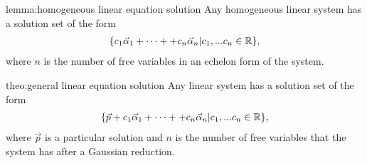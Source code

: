\begin{lemma}{lemma:homogeneous linear equation solution}
	Any homogeneous linear system has a solution set of the form
	\begin{align*}
	\{c_1\vec{\alpha}_1+\cdots++c_n\vec{\alpha}_n| c_1,...c_n \in {\mathbb R}\},
	\end{align*}
	where $n$ is the number of free variables in an echelon form of the system.
\end{lemma}


\begin{theo}{theo:general linear equation solution}
	Any linear system has a solution set of the form
	\begin{align*}
	\{\vec{p}+c_1\vec{\alpha}_1+\cdots++c_n\vec{\alpha}_n| c_1,...c_n \in {\mathbb R}\},
	\end{align*}
	where $\vec{p}$ is a particular solution and $n$ is the number of free variables that the system has after a Gaussian reduction.
\end{theo}
